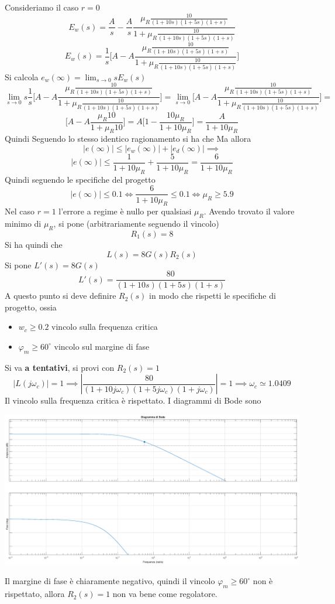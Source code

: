 \documentclass[10pt, letterpaper]{report}
\begin{document}
Consideriamo il caso $r=0$
$$ E_w(s)=\frac{A}{s}-\frac{A}{s}\frac{\mu_R\frac{10}{(1+10s)(1+5s)(1+s)}}{1+\mu_R\frac{10}{(1+10s)(1+5s)(1+s)}}$$
$$ E_w(s)=\frac{1}{s}\Big[A-A\frac{\mu_R\frac{10}{(1+10s)(1+5s)(1+s)}}{1+\mu_R\frac{10}{(1+10s)(1+5s)(1+s)}}\Big]$$
Si calcola $\displaystyle e_w(\infty)=\lim_{s\rightarrow 0}sE_w(s)$
$$ \lim_{s\rightarrow 0}s\frac{1}{s}\Big[A-A\frac{\mu_R\frac{10}{(1+10s)(1+5s)(1+s)}}{1+\mu_R\frac{10}{(1+10s)(1+5s)(1+s)}}\Big]=\lim_{s\rightarrow 0}\Big[A-A\frac{\mu_R\frac{10}{(1+10s)(1+5s)(1+s)}}{1+\mu_R\frac{10}{(1+10s)(1+5s)(1+s)}}\Big]=$$
$$ \Big[A-A\frac{\mu_R{10}}{1+\mu_R{10}}\Big]=A\Big[1-\frac{10\mu_R}{1+10\mu_R}\Big]=
\frac{A}{1+10\mu_R}$$
Quindi
Seguendo lo stesso identico ragionamento si ha che 
Ma allora 
$$ |e(\infty)|\le |e_w(\infty)|+ |e_d(\infty)|\implies $$
$$ |e(\infty)|\le \dfrac{1}{1+10\mu_R}+\dfrac{5}{1+10\mu_R}=\dfrac{6}{1+10\mu_R}$$
Quindi seguendo le specifiche del progetto 
$$ |e(\infty)|\le0.1\iff \dfrac{6}{1+10\mu_R}\le 0.1 \iff \mu_R\ge 5.9$$
Nel caso $r=1$ l'errore a regime è nullo per qualsiasi $\mu_R$. Avendo trovato il valore minimo di $\mu_R$, si pone (arbitrariamente seguendo il vincolo)
$$ R_1(s)=8$$
Si ha quindi che 
$$ L(s)=8G(s)R_2(s)$$
Si pone $L'(s)=8G(s)$
$$ L'(s)=\frac{80}{(1+10s)(1+5s)(1+s)}$$
A questo punto si deve definire $R_2(s)$ in modo che rispetti le specifiche di progetto, ossia\begin{itemize}
    \item $w_c\ge 0.2$ vincolo sulla frequenza critica 
    \item $\varphi_m\ge 60^\circ$ vincolo sul margine di fase
\end{itemize}
Si va \textbf{a tentativi}, si provi con $R_2(s)=1$
$$ |L(j\omega_c)|=1\implies |\frac{80}{(1+10j\omega_c)(1+5j\omega_c)(1+j\omega_c)}|=1\implies \omega_c\simeq 1.0409$$
Il vincolo sulla frequenza critica è rispettato. I diagrammi di Bode sono
\begin{center}
    \includegraphics[width=1\textwidth ]{images/EsercizioControlloreBode.eps}
\end{center}
Il margine di fase è chiaramente negativo, quindi il vincolo $\varphi_m\ge 60^\circ$ non è rispettato, allora $R_2(s)=1$ non va bene come regolatore.\\









 
\end{document}

